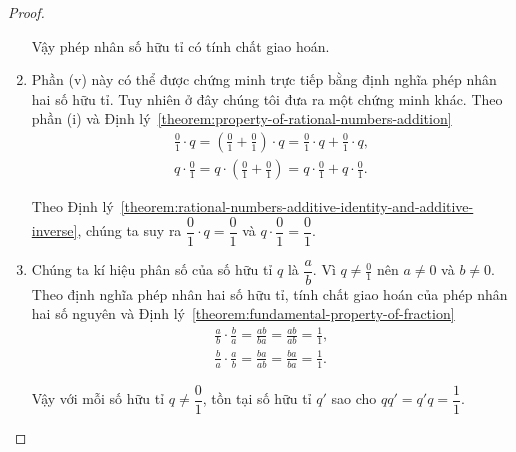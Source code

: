 \begin{proof}
\begin{enumerate}[label={(\roman*)}]
              Vậy phép nhân số hữu tỉ có tính chất giao hoán.
        \item Phần (v) này có thể được chứng minh trực tiếp bằng định nghĩa phép nhân hai số hữu tỉ. Tuy nhiên ở đây chúng tôi đưa ra một chứng minh khác. Theo phần (i) và Định lý~\ref{theorem:property-of-rational-numbers-addition}
              \[
                  \begin{split}
                      \frac{0}{1}\cdot q = \left(\frac{0}{1} + \frac{0}{1}\right)\cdot q = \frac{0}{1}\cdot q + \frac{0}{1}\cdot q, \\
                      q\cdot \frac{0}{1} = q\cdot \left(\frac{0}{1} + \frac{0}{1}\right) = q\cdot \frac{0}{1} + q\cdot \frac{0}{1}.
                  \end{split}
              \]

              Theo Định lý~\ref{theorem:rational-numbers-additive-identity-and-additive-inverse}, chúng ta suy ra $\dfrac{0}{1}\cdot q = \dfrac{0}{1}$ và $q\cdot\dfrac{0}{1} = \dfrac{0}{1}$.
        \item Chúng ta kí hiệu phân số của số hữu tỉ $q$ là $\dfrac{a}{b}$. Vì $q\ne \frac{0}{1}$ nên $a\ne 0$ và $b\ne 0$. Theo định nghĩa phép nhân hai số hữu tỉ, tính chất giao hoán của phép nhân hai số nguyên và Định lý~\ref{theorem:fundamental-property-of-fraction}
              \[
                  \begin{split}
                      \frac{a}{b}\cdot\frac{b}{a} = \frac{ab}{ba} = \frac{ab}{ab} = \frac{1}{1}, \\
                      \frac{b}{a}\cdot\frac{a}{b} = \frac{ba}{ab} = \frac{ba}{ba} = \frac{1}{1}.
                  \end{split}
              \]

              Vậy với mỗi số hữu tỉ $q\ne \dfrac{0}{1}$, tồn tại số hữu tỉ $q'$ sao cho $qq' = q'q = \dfrac{1}{1}$.
    \end{enumerate}
\end{proof}

